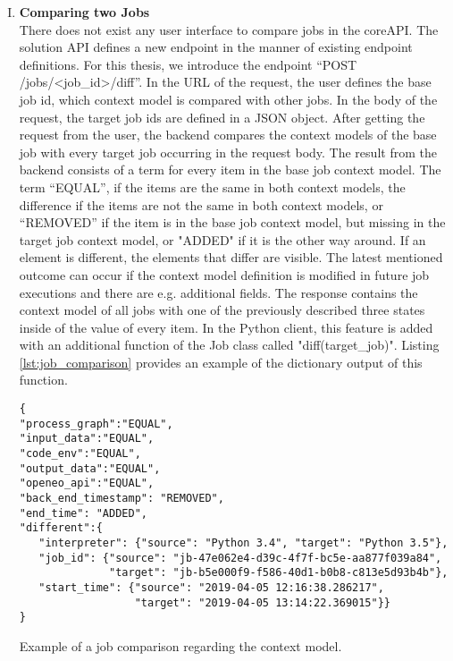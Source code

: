 \documentclass[draft,final]{vutinfth} %
\newcommand{\bgoesswein}[1]{{\color{blue}#1}}
\begin{document}
\begin{enumerate}[I.]
\item \textbf{Comparing two Jobs} \\
	There does not exist any user interface to compare jobs in the coreAPI. The solution API defines a new endpoint in the manner of existing endpoint definitions. For this thesis, we introduce the endpoint  “POST /jobs/<job\_id>/diff”. In the URL of the request, the user defines the base job id, which context model is compared with other jobs. In the body of the request, the target job ids are defined in a JSON object. After getting the request from the user, the backend compares the context models of the base job with every target job occurring in the request body. The result from the backend consists of a term for every item in the base job context model. The term “EQUAL”, if the items are the same in both context models, the difference if the items are not the same in both context models, or \bgoesswein{“REMOVED”} if the item is in the base job context model, but missing in the target job context model, or \bgoesswein{"ADDED" if it is} the other way around. If an element is different, the elements that differ are visible. The latest mentioned outcome can occur if the context model definition is modified in future job executions and there are e.g. additional fields. The response contains the context model of all jobs with one of the previously described three states inside of the value of every item. In the Python client, this feature is added with an additional function of the Job class called "diff(target\_job)". Listing \ref{lst:job_comparison} provides an example of the dictionary output of this function.
\begin{listing}[ht]
	\begin{verbatim}
{
"process_graph":"EQUAL",
"input_data":"EQUAL",
"code_env":"EQUAL",
"output_data":"EQUAL",
"openeo_api":"EQUAL",
"back_end_timestamp": "REMOVED",
"end_time": "ADDED",
"different":{
   "interpreter": {"source": "Python 3.4", "target": "Python 3.5"},
   "job_id": {"source": "jb-47e062e4-d39c-4f7f-bc5e-aa877f039a84", 
              "target": "jb-b5e000f9-f586-40d1-b0b8-c813e5d93b4b"},
   "start_time": {"source": "2019-04-05 12:16:38.286217",
                  "target": "2019-04-05 13:14:22.369015"}}
}
	\end{verbatim}
	\caption{Example of a job comparison regarding the context model.}
	\label{lst:job_comparison}
\end{listing}	


\end{enumerate}
\end{document}
